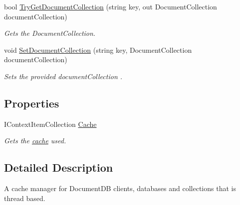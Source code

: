 \begin{DoxyCompactItemize}
bool \hyperlink{classCqrs_1_1Azure_1_1DocumentDb_1_1ThreadedAzureDocumentDbConnectionCache_a0986cecb40fc143751abb4605f507975_a0986cecb40fc143751abb4605f507975}{Try\+Get\+Document\+Collection} (string key, out Document\+Collection document\+Collection)
\begin{DoxyCompactList}\small\item\em Gets the Document\+Collection. \end{DoxyCompactList}\item 
void \hyperlink{classCqrs_1_1Azure_1_1DocumentDb_1_1ThreadedAzureDocumentDbConnectionCache_a069d9161ed5649cc3e65cda641d5173d_a069d9161ed5649cc3e65cda641d5173d}{Set\+Document\+Collection} (string key, Document\+Collection document\+Collection)
\begin{DoxyCompactList}\small\item\em Sets the provided {\itshape document\+Collection} . \end{DoxyCompactList}\end{DoxyCompactItemize}
\subsection*{Properties}
\begin{DoxyCompactItemize}
\item 
I\+Context\+Item\+Collection \hyperlink{classCqrs_1_1Azure_1_1DocumentDb_1_1ThreadedAzureDocumentDbConnectionCache_ade4db14c86a07454b713e1fb711692e2_ade4db14c86a07454b713e1fb711692e2}{Cache}
\begin{DoxyCompactList}\small\item\em Gets the \hyperlink{}{cache} used. \end{DoxyCompactList}\end{DoxyCompactItemize}


\subsection{Detailed Description}
A cache manager for Document\+DB clients, databases and collections that is thread based. 



